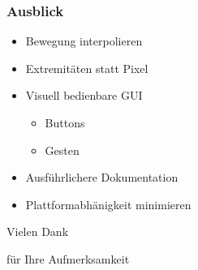 \documentclass[compress]{beamer}
\begin{document}
\begin{frame}
\frametitle{Ausblick}
\begin{itemize}
	\item Bewegung interpolieren
	\item Extremitäten statt Pixel
	\item Visuell bedienbare GUI
	\begin{itemize}
		\item Buttons
		\item Gesten
	\end{itemize}
	\item Ausführlichere Dokumentation
	\item Plattformabhänigkeit minimieren
\end{itemize}
\end{frame}

\begin{frame}
\Huge
\centerline{Vielen Dank}
\centerline{für Ihre Aufmerksamkeit}
\end{frame}
\end{document}

